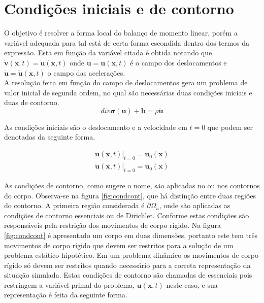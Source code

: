 \section{Condições iniciais e de contorno}

O objetivo é resolver a forma local do balanço de momento linear, porém a variável adequada para tal está de certa forma escondida dentro dos termos da expressão. Esta em função da variável citada é obtida notando que $ \dot{\boldsymbol{v}}(\boldsymbol{x},t) = \ddot{\boldsymbol{u}}(\boldsymbol{x},t) $ onde $ \boldsymbol{u} = \boldsymbol{u}(\boldsymbol{x},t)$ é o campo dos deslocamentos e $ \ddot{\boldsymbol{u}} = \ddot{\boldsymbol{u}} (\boldsymbol{x},t) $ o campo das acelerações. \\ A resolução feita em função do campo de deslocamentos gera um problema de valor inicial de segunda ordem, no qual são necessárias duas condições iniciais e duas de contorno.\\

\begin{equation}
	div\boldsymbol{\sigma(\boldsymbol{u})} + \boldsymbol{b} = \rho \ddot{\boldsymbol{u}}
\end{equation}

As condições iniciais são o deslocamento e a velocidade em $ t = 0 $ que podem ser denotadas da seguinte forma.

\begin{align} 
	\boldsymbol{u}(\boldsymbol{x},t)|_{t=0} = \boldsymbol{u}_{0}(\boldsymbol{x}) \\
	\dot{\boldsymbol{u}}(\boldsymbol{x},t)|_{t=0} = \dot{\boldsymbol{u}_{0}}(\boldsymbol{x})
\end{align} 

As condições de contorno, como sugere o nome, são aplicadas no ou nos contornos do corpo. Observa-se na figura \ref{fig:condcont}, que há distinção entre duas regiões do contorno. A primeira região considerada é $ \partial \Omega_u $, onde são aplicadas as condições de contorno essenciais ou de Dirichlet. Conforme \cite{Paulo} estas condições são responsáveis pela restrição dos movimentos de corpo rígido. Na figura \ref{fig:condcont} é apresentado um corpo em duas dimensões, portanto este tem três movimentos de corpo rígido que devem ser restritos para a solução de um problema estático hipotético. Em um problema dinâmico os movimentos de corpo rígido só devem ser restritos quando necessário para a correta representação da situação simulada. Estas condições de contorno são chamadas de essenciais pois restringem a variável primal do problema, $ \boldsymbol{u}(\boldsymbol{x},t) $ neste caso, e sua representação é feita da seguinte forma.

